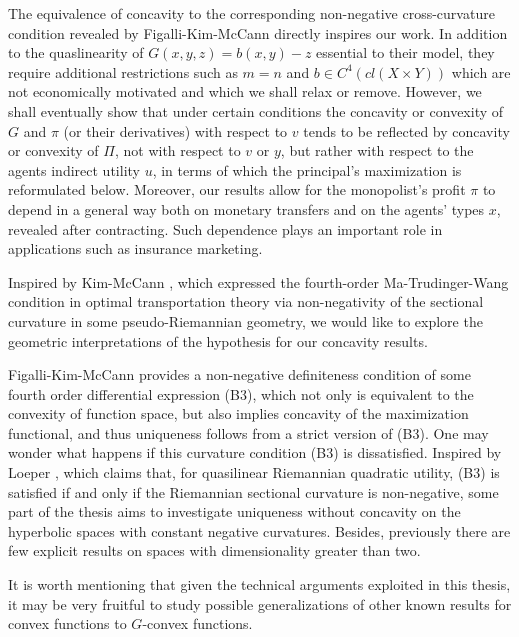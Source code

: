 	The equivalence of concavity to the corresponding non-negative cross-curvature condition revealed by Figalli-Kim-McCann \cite{FigalliKimMcCann11} directly inspires our work. In addition to the quaslinearity of
	$G(x,y,z) = b(x,y) - z$ essential to their model,  they require additional restrictions such as $m=n$ and $b \in C^4(cl(X\times Y))$ which are not economically motivated
	and which we shall relax or remove. However,  we shall eventually show that under certain conditions the concavity or convexity of $G$ and $\pi$ (or their derivatives)
	with respect to $v$ tends to be reflected by concavity or convexity of $\Pi$, not with respect to 
	$v$ or $y$,  but rather with respect to the agents indirect utility $u$, in terms of 
	which the principal's maximization is reformulated below. Moreover, our results allow for the monopolist's profit $\pi$ to depend in a general
	way both on monetary transfers and on the agents' types $x$,  revealed after contracting.  Such dependence plays an important role in applications such as insurance marketing.\medskip
	
	Inspired by Kim-McCann \cite{KimMcCann10}, which expressed the fourth-order Ma-Trudinger-Wang condition in optimal transportation theory via non-negativity of the sectional curvature in some pseudo-Riemannian geometry,
	we would like to explore the geometric interpretations of the hypothesis for our concavity results.\medskip


Figalli-Kim-McCann \cite{FigalliKimMcCann11} provides a non-negative definiteness condition of some fourth order differential expression (B3), which not only is equivalent to the convexity of function space,  but also implies concavity of the maximization functional, and thus uniqueness follows from a strict version of (B3). One may wonder what happens if this curvature condition (B3) is dissatisfied. Inspired by Loeper \cite{Loeper09}, which claims that, for quasilinear Riemannian quadratic utility, (B3) is satisfied if and only if the Riemannian sectional curvature is non-negative, some part of the thesis aims to investigate uniqueness  
without concavity on the hyperbolic spaces with constant negative curvatures. Besides, previously there are few explicit results on spaces with dimensionality greater than two.\medskip

It is worth mentioning that given the technical arguments exploited in this thesis, it may be very fruitful to study possible generalizations of other known results for convex functions to $G$-convex functions.
\medskip


